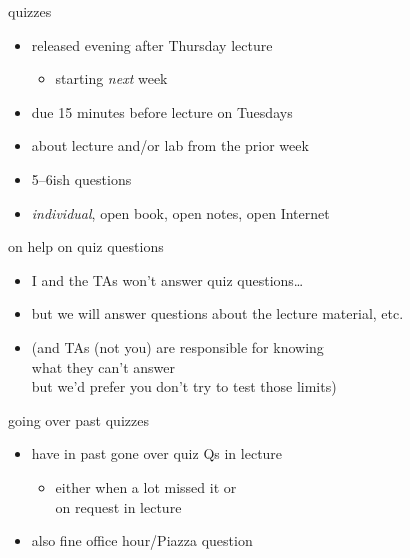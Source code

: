 \begin{frame}{quizzes}
    \begin{itemize}
    \item released evening after Thursday lecture
        \begin{itemize}
        \item starting \textit{next} week
        \end{itemize}
    \item due 15 minutes before lecture on Tuesdays
    \vspace{.5cm}
    \item about lecture and/or lab from the prior week
    \item 5--6ish questions
    \item \textit{individual}, open book, open notes, open Internet
    \end{itemize}
\end{frame}

\begin{frame}{on help on quiz questions}
    \begin{itemize}
    \item I and the TAs won't answer quiz questions\ldots
    \item but we will answer questions about the lecture material, etc.
    \vspace{.5cm}
    \item (and TAs (not you) are responsible for knowing \\
        what they can't answer \\
        but we'd prefer you don't try to test those limits)
    \end{itemize}
\end{frame}

\begin{frame}{going over past quizzes}
    \begin{itemize}
    \item have in past gone over quiz Qs in lecture
        \begin{itemize}
        \item either when a lot missed it or \\
             on request in lecture
         \end{itemize}
    \item also fine office hour/Piazza question
    \end{itemize}
\end{frame}
